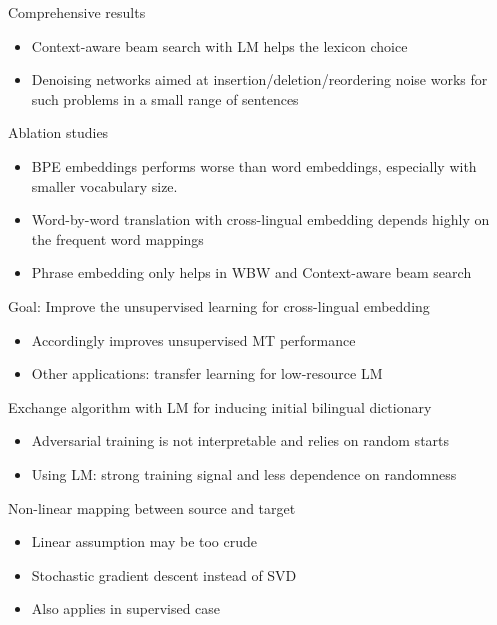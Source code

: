 \documentclass[11pt, a4paper, landscape]{article}
\begin{document}
\vfill

	\NewPage
	\vfill
	Comprehensive results
	\begin{itemize}
		\item Context-aware beam search with LM helps the lexicon choice
		\item Denoising networks aimed at insertion/deletion/reordering noise works for such problems in a small range of sentences
	\end{itemize}
	Ablation studies
	\begin{itemize}
		\item BPE embeddings performs worse than word embeddings, especially with smaller
		vocabulary size.
		\item Word-by-word translation with cross-lingual
embedding depends highly on the frequent word mappings
		\item Phrase embedding only helps in WBW and Context-aware beam search
	\end{itemize}
	\vfill
	\NewPage
	\vfill
	Goal: Improve the unsupervised learning for cross-lingual embedding

	\begin{itemize}
		\item Accordingly improves unsupervised MT performance
		\item Other applications: transfer learning for low-resource LM \cite{adams2017cross}\\
	\end{itemize}
   
	 Exchange algorithm with LM for inducing initial bilingual dictionary
	 \begin{itemize}
	 \item Adversarial training is not interpretable and relies on random starts
	\item Using LM: strong training signal and less dependence on randomness\\
	 \end{itemize}
	 
	 Non-linear mapping between source and target
	 \begin{itemize}
	 	\item Linear assumption may be too crude
	 	\item Stochastic gradient descent instead of SVD
	 	\item Also applies in supervised case
	 \end{itemize}
	\vfill

	
	

	\FinalPage
	

	
	
	\NewPage
	
	
	
\end{document}

